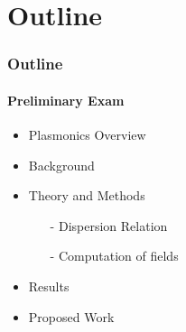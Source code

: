 \documentclass[mathserif,18pt,xcolor=table]{beamer}
\begin{document}
\section{Outline}
\begin{frame}
  \frametitle{Outline}
  \framesubtitle{Preliminary Exam}
  \begin{itemize}
    \item Plasmonics Overview
    \item Background
    \item Theory and Methods
    \begin{itemize}
      \item[-]{Dispersion Relation}
      \item[-]{Computation of fields}
    \end{itemize}
    \item Results
    \item Proposed Work
  \end{itemize}
\end{frame}
\end{document}
